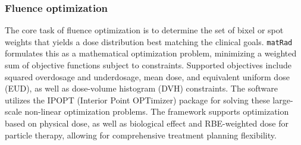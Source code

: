 \subsubsection{Fluence optimization}
The core task of fluence optimization is to determine the set of bixel or spot weights that yields a dose distribution best matching the clinical goals. \texttt{matRad} formulates this as a mathematical optimization problem, minimizing a weighted sum of objective functions subject to constraints. Supported objectives include squared overdosage and underdosage, mean dose, and equivalent uniform dose (EUD), as well as dose-volume histogram (DVH) constraints. The software utilizes the IPOPT (Interior Point OPTimizer) package for solving these large-scale non-linear optimization problems. The framework supports optimization based on physical dose, as well as biological effect and RBE-weighted dose for particle therapy, allowing for comprehensive treatment planning flexibility.

